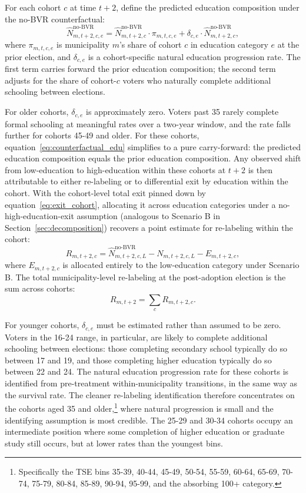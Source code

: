 For each cohort $c$ at time $t+2$, define the predicted education composition under the no-BVR counterfactual:
\begin{equation}
\widehat{N}_{m,t+2,c,e}^{\text{no-BVR}} = \widehat{N}_{m,t+2,c}^{\text{no-BVR}} \cdot \pi_{m,t,c,e} + \delta_{c,e} \cdot \widehat{N}_{m,t+2,c}^{\text{no-BVR}},
\label{eq:counterfactual_edu}
\end{equation}
where $\pi_{m,t,c,e}$ is municipality $m$'s share of cohort $c$ in education category $e$ at the prior election, and $\delta_{c,e}$ is a cohort-specific natural education progression rate. The first term carries forward the prior education composition; the second term adjusts for the share of cohort-$c$ voters who naturally complete additional schooling between elections.

For older cohorts, $\delta_{c,e}$ is approximately zero. Voters past 35 rarely complete formal schooling at meaningful rates over a two-year window, and the rate falls further for cohorts 45-49 and older. For these cohorts, equation~\eqref{eq:counterfactual_edu} simplifies to a pure carry-forward: the predicted education composition equals the prior education composition. Any observed shift from low-education to high-education within these cohorts at $t+2$ is then attributable to either re-labeling or to differential exit by education within the cohort. With the cohort-level total exit pinned down by equation~\eqref{eq:exit_cohort}, allocating it across education categories under a no-high-education-exit assumption (analogous to Scenario B in Section~\ref{sec:decomposition}) recovers a point estimate for re-labeling within the cohort:
\begin{equation}
R_{m,t+2,c} = \widehat{N}_{m,t+2,c,L}^{\text{no-BVR}} - N_{m,t+2,c,L} - E_{m,t+2,c},
\label{eq:relabel_cohort}
\end{equation}
where $E_{m,t+2,c}$ is allocated entirely to the low-education category under Scenario B. The total municipality-level re-labeling at the post-adoption election is the sum across cohorts:
\begin{equation}
R_{m,t+2} = \sum_c R_{m,t+2,c}.
\label{eq:relabel_total}
\end{equation}

For younger cohorts, $\delta_{c,e}$ must be estimated rather than assumed to be zero. Voters in the 16-24 range, in particular, are likely to complete additional schooling between elections: those completing secondary school typically do so between 17 and 19, and those completing higher education typically do so between 22 and 24. The natural education progression rate for these cohorts is identified from pre-treatment within-municipality transitions, in the same way as the survival rate. The cleaner re-labeling identification therefore concentrates on the cohorts aged 35 and older,\footnote{Specifically the TSE bins 35-39, 40-44, 45-49, 50-54, 55-59, 60-64, 65-69, 70-74, 75-79, 80-84, 85-89, 90-94, 95-99, and the absorbing 100+ category.} where natural progression is small and the identifying assumption is most credible. The 25-29 and 30-34 cohorts occupy an intermediate position where some completion of higher education or graduate study still occurs, but at lower rates than the youngest bins.

